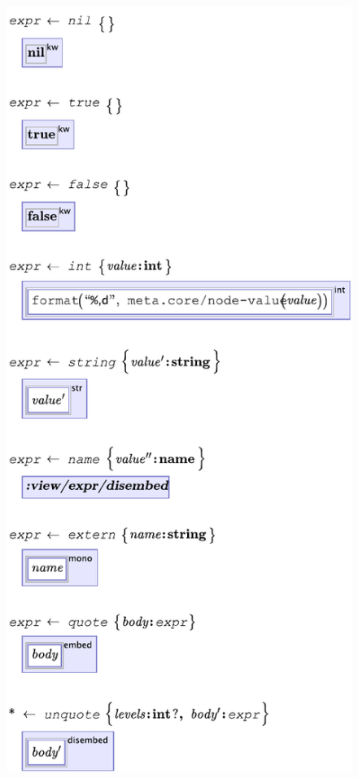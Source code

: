 
\begin{figure}
  
  \begin{minipage}[t]{0.48\linewidth}
  \vspace{0pt}  %
  \begin{center}
  \includegraphics[scale=0.65]{src/image/kernel1.pdf}

\end{center}
\end{minipage}
\end{figure}
